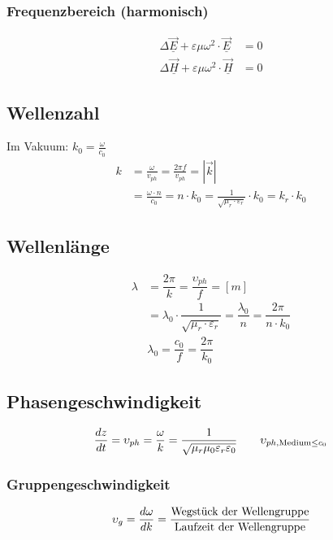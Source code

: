 \subsubsection{Frequenzbereich (harmonisch)}
\begin{align*}
    \Delta \underline{\vec{E}}+\varepsilon \mu \omega^{2} \cdot \underline{\vec{E}} & =0 \\
    \Delta \underline{\vec{H}}+\varepsilon \mu \omega^{2} \cdot \underline{\vec{H}} & =0
\end{align*}


\subsection{Wellenzahl}
Im Vakuum: $k_{0}=\frac{\omega}{c_{0}}$
\begin{align*}
    k & = \frac{\omega}{v_{p h}} = \frac{2 \pi f}{v_{p h}} = |\vec{k}|                                                              \\
      & = \frac{\omega \cdot n}{c_{0}} = n \cdot k_{0}=\frac{1}{\sqrt{\mu_{r} \cdot \varepsilon_{r}}} \cdot k_{0}=k_{r} \cdot k_{0}
\end{align*}

\subsection{Wellenlänge}
\begin{align*}
    \lambda & = \dfrac{2 \pi}{k} = \dfrac{\upsilon_{ph}}{f} = [m]                                                               \\
            & = \lambda_0 \cdot \dfrac{1}{\sqrt{\mu_r \cdot \varepsilon_r}} = \dfrac{\lambda_0}{n} = \dfrac{2 \pi}{n \cdot k_0} \\
            & \lambda_0 = \dfrac{c_0}{f} = \dfrac{2\pi}{k_0}
\end{align*}

\subsection{Phasengeschwindigkeit}
\[
    \dfrac{d z}{d t} = \upsilon_{ph} = \dfrac{\omega}{k} = \frac{1}{\sqrt{ \mu_r \mu_0 \varepsilon_r \varepsilon_0}} \qquad \upsilon_{ph,\textnormal{Medium} \leq c_0}
\]

\subsubsection{Gruppengeschwindigkeit}
\[
    \upsilon_{g} = \dfrac{d \omega}{d k} = \dfrac{\textnormal{Wegstück der Wellengruppe}}{\textnormal{Laufzeit der Wellengruppe}}
\]

